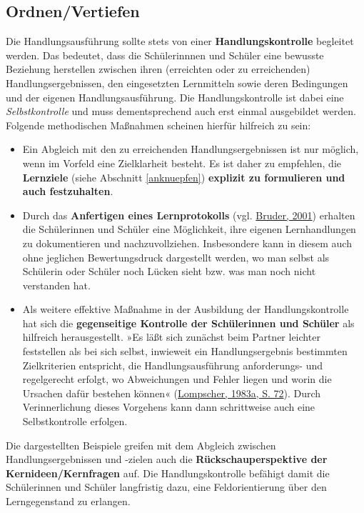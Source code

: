 \documentclass[
]{scrbook}
\theoremstyle{definition}
\theoremstyle{definition}
\theoremstyle{definition}
\theoremstyle{definition}
\theoremstyle{remark}
\begin{document}
\hypertarget{ordnenvertiefen}{%
\subsection{Ordnen/Vertiefen}\label{ordnenvertiefen}}

Die Handlungsausführung sollte stets von einer \textbf{Handlungskontrolle} begleitet werden. Das bedeutet, dass die Schülerinnnen und Schüler eine bewusste Beziehung herstellen zwischen ihren (erreichten oder zu erreichenden) Handlungsergebnissen, den eingesetzten Lernmitteln sowie deren Bedingungen und der eigenen Handlungsausführung.
Die Handlungskontrolle ist dabei eine \emph{Selbstkontrolle} und muss dementsprechend auch erst einmal ausgebildet werden. Folgende methodischen Maßnahmen scheinen hierfür hilfreich zu sein:

\begin{itemize}
\item
  Ein Abgleich mit den zu erreichenden Handlungsergebnissen ist nur möglich, wenn im Vorfeld eine Zielklarheit besteht. Es ist daher zu empfehlen, die \textbf{Lernziele} (siehe Abschnitt \ref{anknuepfen}) \textbf{explizit zu formulieren und auch festzuhalten}.
\item
  Durch das \textbf{Anfertigen eines Lernprotokolls} (vgl. \protect\hyperlink{ref-Bruder2011}{Bruder, 2001}) erhalten die Schülerinnen und Schüler eine Möglichkeit, ihre eigenen Lernhandlungen zu dokumentieren und nachzuvollziehen. Insbesondere kann in diesem auch ohne jeglichen Bewertungsdruck dargestellt werden, wo man selbst als Schülerin oder Schüler noch Lücken sieht bzw. was man noch nicht verstanden hat.
\item
  Als weitere effektive Maßnahme in der Ausbildung der Handlungskontrolle hat sich die \textbf{gegenseitige Kontrolle der Schülerinnen und Schüler} als hilfreich herausgestellt. »Es läßt sich zunächst beim Partner leichter feststellen als bei sich selbst, inwieweit ein Handlungsergebnis bestimmten Zielkriterien entspricht, die Handlungsausführung anforderungs- und regelgerecht erfolgt, wo Abweichungen und Fehler liegen und worin die Ursachen dafür bestehen können« (\protect\hyperlink{ref-Lompscher1983a}{Lompscher, 1983a, S. 72}). Durch Verinnerlichung dieses Vorgehens kann dann schrittweise auch eine Selbstkontrolle erfolgen.
\end{itemize}

Die dargestellten Beispiele greifen mit dem Abgleich zwischen Handlungsergebnissen und -zielen auch die \textbf{Rückschauperspektive der Kernideen/Kernfragen} auf. Die Handlungskontrolle befähigt damit die Schülerinnen und Schüler langfristig dazu, eine Feldorientierung über den Lerngegenstand zu erlangen.
\end{document}

